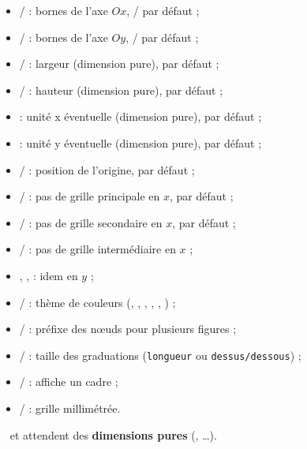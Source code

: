 \documentclass[11pt,a4paper]{ltxdoc}
\begin{document}
\begin{itemize}
	\item {}/ : bornes de l'axe $Ox$, / par défaut ;
	\item {}/ : bornes de l'axe $Oy$, / par défaut ;
	\item {} /  : largeur (dimension pure), \MontreCode{8cm} par défaut ;
	\item {} /  : hauteur (dimension pure), \MontreCode{6cm} par défaut ;
  \item {} : unité x éventuelle (dimension pure),  par défaut ;
  \item {} : unité y éventuelle (dimension pure),  par défaut ;
	\item {} /  : position de l'origine,  par défaut ;
	\item {} /  : pas de grille principale en $x$,  par défaut ;
	\item {} /  : pas de grille secondaire en $x$,  par défaut ;
	\item {} /  : pas de grille intermédiaire en $x$ ;
	\item {}, ,  : idem en $y$ ;
	\item {} /  : thème de couleurs (, , , , , ) ;
	\item {} /  : préfixe des nœuds pour plusieurs figures ;
	\item {} /  : taille des graduations (\texttt{longueur} ou \texttt{dessus/dessous}) ;
  \item {} /  : affiche un cadre ;
	\item {} /  : grille millimétrée.
\end{itemize}

{\footnotesize\faBomb}~ et  attendent des \textbf{dimensions pures} (\MontreCode{8cm}, \MontreCode{120mm}\ldots).
\end{document}
